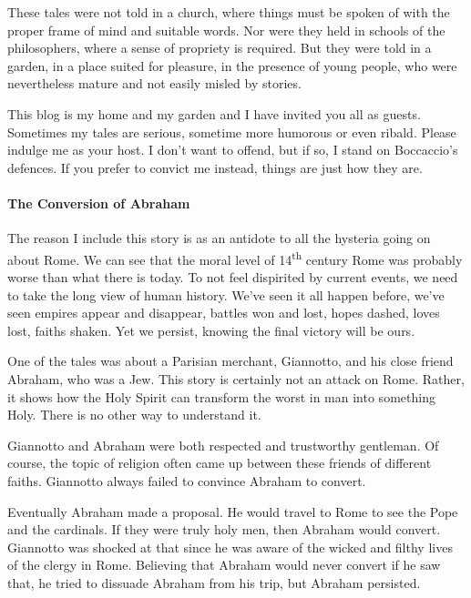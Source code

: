 \begin{quotex}
These tales were not told in a church, where things must be spoken of with the proper frame of mind and suitable words. Nor were they held in schools of the philosophers, where a sense of propriety is required. But they were told in a garden, in a place suited for pleasure, in the presence of young people, who were nevertheless mature and not easily misled by stories.
\end{quotex}


This blog is my home and my garden and I have invited you all as guests. Sometimes my tales are serious, sometime more humorous or even ribald. Please indulge me as your host. I don't want to offend, but if so, I stand on Boccaccio's defences. If you prefer to convict me instead, things are just how they are.

\paragraph{The Conversion of Abraham}


The reason I include this story is as an antidote to all the hysteria going on about Rome. We can see that the moral level of 14\textsuperscript{th} century Rome was probably worse than what there is today. To not feel dispirited by current events, we need to take the long view of human history. We've seen it all happen before, we've seen empires appear and disappear, battles won and lost, hopes dashed, loves lost, faiths shaken. Yet we persist, knowing the final victory will be ours.

One of the tales was about a Parisian merchant, Giannotto, and his close friend Abraham, who was a Jew. This story is certainly not an attack on Rome. Rather, it shows how the Holy Spirit can transform the worst in man into something Holy. There is no other way to understand it.

Giannotto and Abraham were both respected and trustworthy gentleman. Of course, the topic of religion often came up between these friends of different faiths. Giannotto always failed to convince Abraham to convert.

Eventually Abraham made a proposal. He would travel to Rome to see the Pope and the cardinals. If they were truly holy men, then Abraham would convert. Giannotto was shocked at that since he was aware of the wicked and filthy lives of the clergy in Rome. Believing that Abraham would never convert if he saw that, he tried to dissuade Abraham from his trip, but Abraham persisted.

